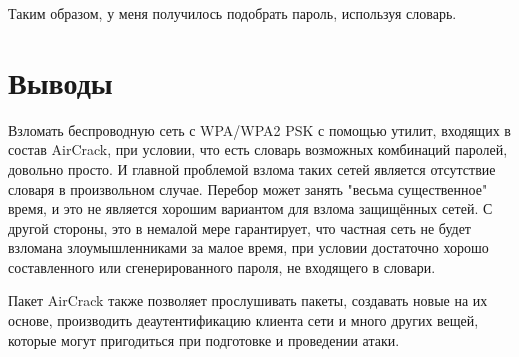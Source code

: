 \documentclass[a4paper]{article}
\begin{document}
Таким образом, у меня получилось подобрать пароль, используя словарь.

\section{Выводы}

Взломать беспроводную сеть с WPA/WPA2 PSK с помощью утилит, входящих в состав AirCrack, при условии, что есть словарь возможных комбинаций паролей, довольно просто. И главной проблемой взлома таких сетей является отсутствие словаря в произвольном случае. Перебор может занять "весьма существенное" время, и это не является хорошим вариантом для взлома защищённых сетей. С другой стороны, это в немалой мере гарантирует, что частная сеть не будет взломана злоумышленниками за малое время, при условии достаточно хорошо составленного или сгенерированного пароля, не входящего в словари.

Пакет AirCrack также позволяет прослушивать пакеты, создавать новые на их основе, производить деаутентификацию клиента сети и много других вещей, которые могут пригодиться при подготовке и проведении атаки.
\end{document}
